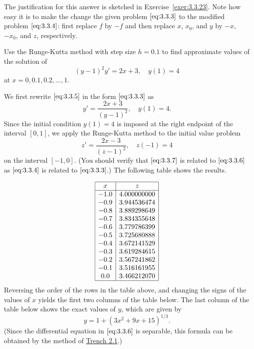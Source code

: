 \documentclass{ximera}
\begin{document}
The justification for this answer is sketched in
Exercise~\ref{exer:3.3.23}. Note how easy it is to make the change
the given problem $\eqref{eq:3.3.3}$ to the modified problem
$\eqref{eq:3.3.4}$: first replace $f$ by $-f$ and then replace $x$,
$x_0$, and $y$ by $-x$, $-x_0$, and $z$, respectively.


\begin{example}\label{example:3.3.5}
Use the Runge-Kutta  method with step size $h=0.1$
 to find approximate values of the solution of
\begin{equation} \label{eq:3.3.5}
(y-1)^2y'=2x+3,\quad y(1)=4
\end{equation}
at $x=0, 0.1, 0.2, \dots, 1$.


\begin{explanation} 
We first rewrite $\eqref{eq:3.3.5}$ in the form $\eqref{eq:3.3.3}$
as
\begin{equation} \label{eq:3.3.6}
y'=\frac{2x+3}{(y-1)^2},\quad y(1)=4.
\end{equation}
Since the initial condition $y(1)=4$  is imposed at the right endpoint
of the interval $[0,1]$, we apply the Runge-Kutta method to the
initial value problem
\begin{equation} \label{eq:3.3.7}
z'=\frac{2x-3}{(z-1)^2},\quad z(-1)=4
\end{equation}
on the interval $[-1,0]$.
(You should verify that $\eqref{eq:3.3.7}$ is related to $\eqref{eq:3.3.6}$ as
$\eqref{eq:3.3.4}$ is related to $\eqref{eq:3.3.3}$.)
 The following table shows the results.  
 
$$
\begin{array}{|c|c|}
\hline
x&
z\\ \hline
-1.0 & 4.000000000  \\
-0.9 & 3.944536474  \\
-0.8 & 3.889298649  \\
-0.7 & 3.834355648  \\
-0.6 & 3.779786399  \\
-0.5 & 3.725680888  \\
-0.4 & 3.672141529  \\
-0.3 & 3.619284615  \\
-0.2 & 3.567241862  \\
-0.1 & 3.516161955  \\
 0.0 & 3.466212070 \\
\hline
\end{array}
$$
 Reversing the
order of the
rows in the table above, and changing the signs of the values of $x$
yields the first two columns of the table below.   The last
column of the table below shows the exact values of $y$, which
are given by
$$
y=1+(3x^2+9x+15)^{1/3}.
$$
(Since the differential equation in $\eqref{eq:3.3.6}$ is separable,
this formula can be obtained by the method of \href{https://xerxes.ximera.org/differentialequations/main/separableEquations/separableEquations}{Trench 2.1}.)



\end{explanation}
\end{example}
\end{document}
